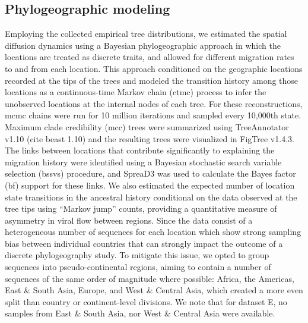 \subsection{Phylogeographic modeling}

Employing the collected empirical tree distributions, we estimated the spatial diffusion dynamics using a Bayesian phylogeographic approach in which the locations are treated as discrete traits, and allowed for different migration rates to and from each location.
This approach conditioned on the geographic locations recorded at the tips of the trees and modeled the transition history among those locations as a continuous-time Markov chain (\gls{ctmc}) process to infer the unobserved locations at the internal nodes of each tree.
For these reconstructions, \gls{mcmc} chains were run for 10 million iterations and sampled every 10,000th state.
Maximum clade credibility (\gls{mcc}) trees were summarized using TreeAnnotator v1.10 (cite \gls{beast} 1.10) and the resulting trees were visualized in FigTree v1.4.3.
The links between locations that contribute significantly to explaining the migration history were identified using a Bayesian stochastic search variable selection (\gls{bssvs}) procedure, and SpreaD3\cite{bielejec2016spread3} was used to calculate the Bayes factor (\gls{bf}) support for these links.
We also estimated the expected number of location state transitions in the ancestral history conditional on the data observed at the tree tips using ``Markov jump'' counts, providing a quantitative measure of asymmetry in viral flow between regions.
Since the data consist of a heterogeneous number of sequences for each location which show strong sampling bias between individual countries that can strongly impact the outcome of a discrete phylogeography study.
To mitigate this issue, we opted to group sequences into pseudo-continental regions, aiming to contain a number of sequences of the same order of magnitude where possible: Africa, the Americas, East \& South Asia, Europe, and West \& Central Asia, which created a more even split than country or continent-level divisions.
We note that for dataset E, no samples from East \& South Asia, nor West \& Central Asia were available.

